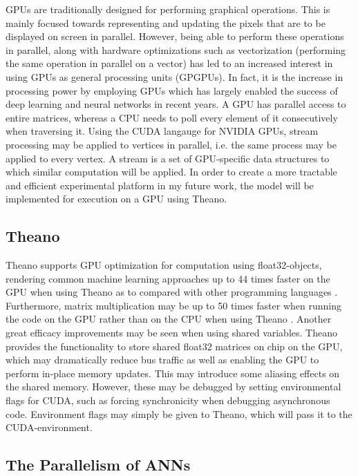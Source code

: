 GPUs are traditionally designed for performing graphical operations. This is mainly focused towards representing and updating the pixels that are to be displayed on screen in parallel. However, being able to perform these operations in parallel, along with hardware optimizations such as vectorization (performing the same operation in parallel on a vector) has led to an increased interest in using GPUs as general processing units (GPGPUs). In fact, it is the increase in processing power by employing GPUs which has largely enabled the success of deep learning and neural networks in recent years.
A GPU has parallel access to entire matrices, whereas a CPU needs to poll every element of it consecutively when traversing it. Using the CUDA langauge for NVIDIA GPUs, stream processing may be applied to vertices in parallel, i.e. the same process may be applied to every vertex. A stream is a set of GPU-specific data structures to which similar computation will be applied.
In order to create a more tractable and efficient experimental platform in my future work, the model will be implemented for execution on a GPU using Theano.

\subsection{Theano}

Theano supports GPU optimization for computation using float32-objects, rendering common machine learning approaches up to 44 times faster on the GPU when using Theano as to compared with other programming languages \citep{Bergstra2010}. Furthermore, matrix multiplication may be up to 50 times faster when running the code on the GPU rather than on the CPU when using Theano \citep{LISAlab}. Another great efficacy improvements may be seen when using shared variables. Theano provides the functionality to store shared float32 matrices on chip on the GPU, which may dramatically reduce bus traffic as well as enabling the GPU to perform in-place memory updates. This may introduce some aliasing effects on the shared memory. However, these may be debugged by setting environmental flags for CUDA, such as forcing synchronicity when debugging asynchronous code. Environment flags may simply be given to Theano, which will pass it to the CUDA-environment.

\subsection{The Parallelism of ANNs}

